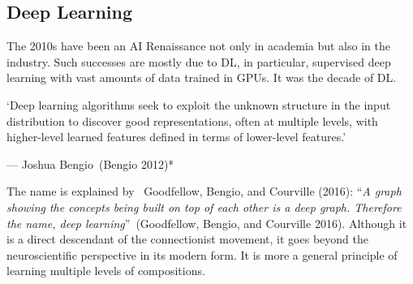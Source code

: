 \documentclass[
  letterpaper,
  12pt,
  british]{tufte-book}
\renewenvironment{quote}{
  \list{}{\leftmargin=3.5cm\topsep=0pt}
  \item\relax\small\itshape
}
{\endlist}
\theoremstyle{plain}
\theoremstyle{definition}
\theoremstyle{plain}
\theoremstyle{remark}
\begin{document}
\hypertarget{deep-learning}{%
\subsection{Deep Learning}\label{deep-learning}}

The 2010s have been an AI Renaissance not only in academia but also in
the industry. Such successes are mostly due to {DL}, in particular,
supervised deep learning with vast amounts of data trained in {GPUs}. It
was the decade of {DL}.

\begin{quote}
`Deep learning algorithms seek to exploit the unknown structure in the
input distribution to discover good representations, often at multiple
levels, with higher-level learned features defined in terms of
lower-level features.'

--- Joshua Bengio~(Bengio
2012)*
\end{quote}

The name is explained by ~Goodfellow, Bengio, and Courville
(2016):
``\emph{A graph showing the concepts being built on top of each other is
a deep graph. Therefore the name, deep learning}''~(Goodfellow, Bengio,
and Courville
2016).
Although it is a direct descendant of the connectionist movement, it
goes beyond the neuroscientific perspective in its modern form. It is
more a general principle of learning multiple levels of compositions.
\end{document}
